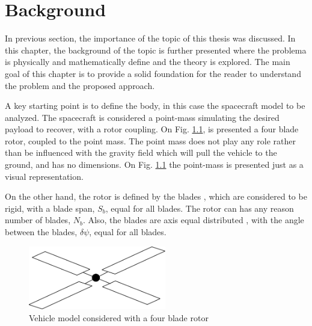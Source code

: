 
\chapter{Background}
\label{chapter:background}

In previous section, the importance of the topic of this thesis was discussed. In this chapter, the background of the topic is further presented where the problema is physically and mathematically define and the theory is explored. The main goal of this chapter is to provide a solid foundation for the reader to understand the problem and the proposed approach.

A key starting point is to define the body, in this case the spacecraft model to be analyzed. The spacecraft is considered a point-mass simulating the desired payload to recover, with a rotor coupling. On Fig. \ref{fig:mode_vehicle}, is presented a four blade rotor, coupled to the point mass. The point mass does not play any role rather than be influenced with the gravity field which will pull the vehicle to the ground, and has no dimensions. On Fig. \ref{fig:mode_vehicle} the point-mass is presented just as a visual representation.

On the other hand, the rotor is defined by the blades , which are considered to be rigid, with a blade span, $S_b$, equal for all blades. The rotor can has any reason number of blades, $N_b$. Also, the blades are axis equal distributed , with the angle between the blades, $\delta\psi$, equal for all blades.

\begin{figure}[!htb]
    \centering
    \includegraphics[width=6cm]{Figures/background/model_vehicle.png}
    \caption{Vehicle model considered with a four blade rotor}
    \label{fig:mode_vehicle}
\end{figure}

